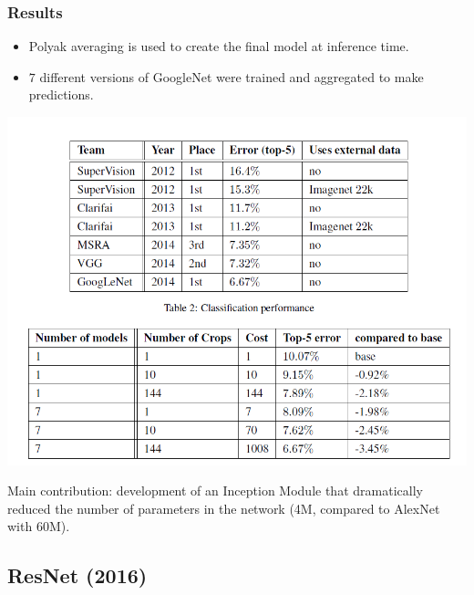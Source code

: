 \begin{frame}
	\frametitle{Results}
	
		\vspace{-0.4cm}
		
		\begin{itemize}
		\item Polyak averaging is used to create the final model at inference time. 
		\item $7$ different versions of GoogleNet were trained and aggregated to make predictions. 
	\end{itemize}


	\begin{center}
		\includegraphics[scale=0.7]{figs/GoogleNet_results}
	\end{center}	



		{\small Main contribution: development of an Inception Module that dramatically reduced the number of parameters in the network (4M, compared to AlexNet with 60M). }
		
\end{frame}


\subsection{ResNet (2016)}

